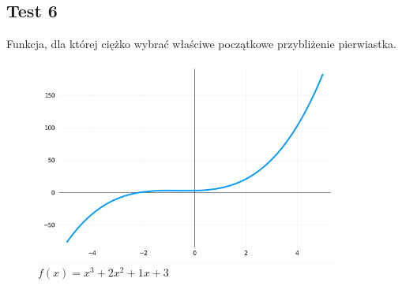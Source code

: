 \documentclass[a4paper]{article}
\begin{document}
\newpage
\subsection{Test 6}
Funkcja, dla której ciężko wybrać właściwe początkowe przybliżenie pierwiastka.
    \begin{figure}[h]
        \centering
        \includegraphics[width=10cm]{6}
        \caption{$f(x) = x^3 + 2x^2 + 1x + 3$}
    \end{figure}
\end{document}
